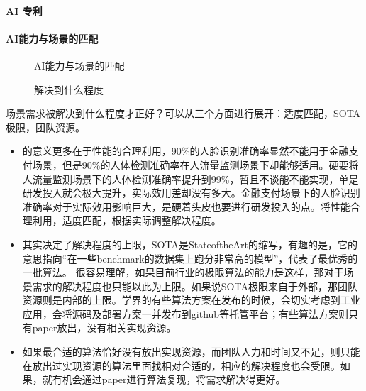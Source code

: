 \documentclass[letterpaper,10pt,english]{sphinxmanual}
\begin{document}
\paragraph{AI 专利}
\label{\detokenize{chapter_introduction/AI_Product:id12}}


\paragraph{AI能力与场景的匹配}
\label{\detokenize{chapter_introduction/AI_Product:id13}}
\begin{figure}[H]
\centering
\capstart

\noindent{}
\caption{AI能力与场景的匹配}\label{\detokenize{chapter_introduction/AI_Product:id22}}\end{figure}

\begin{figure}[H]
\centering
\capstart

\noindent{}
\caption{解决到什么程度}\label{\detokenize{chapter_introduction/AI_Product:id23}}\end{figure}

场景需求被解决到什么程度才正好？可以从三个方面进行展开：适度匹配，SOTA极限，团队资源。
\begin{itemize}
\item {} 
的意义更多在于性能的合理利用，90\%的人脸识别准确率显然不能用于金融支付场景，但是90\%的人体检测准确率在人流量监测场景下却能够适用。硬要将人流量监测场景下的人体检测准确率提升到99\%，暂且不谈能不能实现，单是研发投入就会极大提升，实际效用差却没有多大。金融支付场景下的人脸识别准确率对于实际效用影响巨大，是硬着头皮也要进行研发投入的点。将性能合理利用，适度匹配，根据实际调整解决程度。

\item {} 
其实决定了解决程度的上限，SOTA是State\sphinxhyphen{}of\sphinxhyphen{}the\sphinxhyphen{}Art的缩写，有趣的是，它的意思指向“在一些benchmark的数据集上跑分非常高的模型”，代表了最优秀的一批算法。
很容易理解，如果目前行业的极限算法的能力是这样，那对于场景需求的解决程度也只能以此为上限。如果说SOTA极限来自于外部，那团队资源则是内部的上限。学界的有些算法方案在发布的时候，会切实考虑到工业应用，会将源码及部署方案一并发布到github等托管平台；有些算法方案则只有paper放出，没有相关实现资源。

\item {} 
如果最合适的算法恰好没有放出实现资源，而团队人力和时间又不足，则只能在放出过实现资源的算法里面找相对合适的，相应的解决程度也会受限。如果，就有机会通过paper进行算法复现，将需求解决得更好。

\end{itemize}
\end{document}
